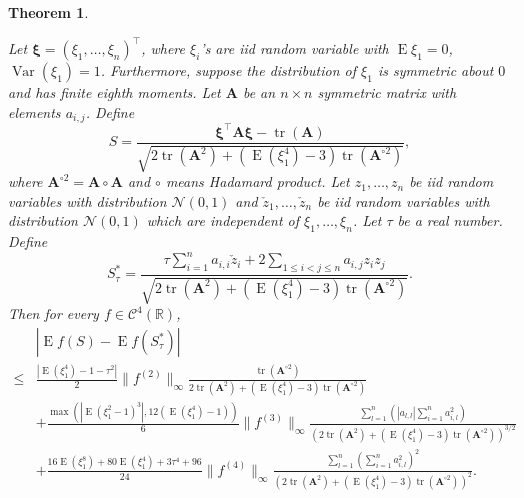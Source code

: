 \documentclass[11pt]{article}
\DeclareMathOperator{\mytr}{tr}
\DeclareMathOperator{\myE}{E}
\DeclareMathOperator{\myVar}{Var}
\newcommand{\BA}{\mathbf{A}}    \newcommand{\BB}{\mathbf{B}}    \newcommand{\BC}{\mathbf{C}}    \newcommand{\BD}{\mathbf{D}}    \newcommand{\BE}{\mathbf{E}}    \newcommand{\BF}{\mathbf{F}}    \newcommand{\BG}{\mathbf{G}}    \newcommand{\BH}{\mathbf{H}}    \newcommand{\BI}{\mathbf{I}}    \newcommand{\BJ}{\mathbf{J}}    \newcommand{\BK}{\mathbf{K}}    \newcommand{\BL}{\mathbf{L}}
\newcommand{\bfsym}[1]{\ensuremath{\boldsymbol{#1}}}
\def\bxi{\bfsym {\xi}}
\theoremstyle{plain}
\newtheorem{theorem}{\quad\quad Theorem}
\theoremstyle{definition}
\theoremstyle{remark}
\begin{document}
\begin{theorem}\label{TheoremLindeberg}

    Let $\bxi=(\xi_1,\ldots,\xi_n)^\top$, where $\xi_i$'s are iid random variable with $\myE \xi_1=0$, $\myVar (\xi_1)=1$.
    Furthermore, suppose the distribution of  $\xi_1$ is symmetric about $0$ and has finite eighth moments.
    Let $\BA$ be an $n\times n$ symmetric matrix with elements $a_{i,j}$.
Define
    \begin{equation*}
        S=\frac{
            \bxi^\top \BA \bxi-\mytr (\BA)
        }{
            \sqrt{
    2 \mytr(\BA^2)
    +
    (\myE (\xi_1^4)-3) \mytr(\BA^{\circ 2})
            }             
        },
    \end{equation*}
    where $\BA^{\circ 2}=\BA\circ \BA$ and $\circ$ means Hadamard product.
    Let $z_1,\ldots,z_n$  be iid random variables with distribution $\mathcal N (0, 1) $ and $\check z_1, \ldots, \check z_n$ be iid random variables with distribution $\mathcal N (0,1)$ which are independent of $\xi_1,\ldots, \xi_n$.
    Let $\tau$ be a real number.
    Define
    \begin{equation*}
        S_\tau^* =
        \frac{
            \tau \sum_{i=1}^n  a_{i,i}\check z_i
        +2\sum_{1\leq i <j \leq n} a_{i,j} z_i z_j
    }
    {
            \sqrt{
    2 \mytr(\BA^2)
    +
    (\myE (\xi_1^4)-3) \mytr(\BA^{\circ 2})
            }             
        }.
    \end{equation*}
    Then for every $f\in \mathscr C^4(\mathbb R)$,
    \begin{equation}\label{eq:longInequality}
        \begin{split}
             &
              \left| \myE f(S)-\myE f(S_\tau^*)\right|
             \\
\leq&
\frac{
\left|
\myE (\xi_1^4)-1
            -
            \tau^2
\right|
}{2}
\|f^{(2)}\|_\infty
\frac{
    \mytr(\BA^{\circ 2})
}{
    2 \mytr(\BA^2)
    +
    (\myE (\xi_1^4)-3) \mytr(\BA^{\circ 2})
}
\\
&
            +
            \frac{
            \max\left(
    \left|\myE (\xi_1^2-1)^3\right|
            ,
12 (\myE (\xi_1^4)-1)
        \right)
            }{6} \|f^{(3)}\|_\infty
            \frac{
            \sum_{l=1}^n 
            \left(|a_{l,l}|
         \sum_{i=1}^{n} a_{i,l}^2 
     \right)
 }{
    \left(
        2 \mytr(\BA^2)
    +
    (\myE (\xi_1^4)-3) \mytr(\BA^{\circ 2})
\right)^{3/2}
 }
         \\
            &+
            \frac{
             16 \myE (\xi_1^8) + 80 \myE (\xi_1^4) + 3\tau^4 + 96 
            }{24} \|f^{(4)} \|_{\infty} 
            \frac{
                \sum_{l=1}^n \left( \sum_{i=1}^n a_{i,l}^2 \right)^2
            }{
            \left(
        2 \mytr(\BA^2)
    +
    (\myE (\xi_1^4)-3)\mytr(\BA^{\circ 2})
\right)^{2}
            }
            .
        \end{split}
    \end{equation}
    \label{approximation}
\end{theorem}
\end{document}
